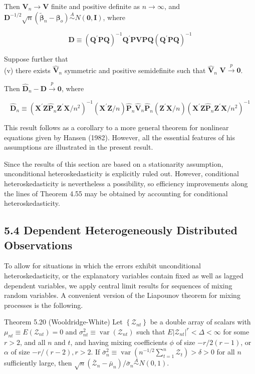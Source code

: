 \documentclass[10pt]{article}
\begin{document}
Then $\mathbf{V}_{n} \rightarrow \mathbf{V}$ finite and positive definite as $n \rightarrow \infty$, and $\mathbf{D}^{-1 / 2} \sqrt{n}\left(\tilde{\boldsymbol{\beta}}_{n}-\right. \left.\boldsymbol{\beta}_{o}\right) \stackrel{A}{\sim} N(\mathbf{0}, \mathbf{I})$, where

$$
\mathbf{D} \equiv\left(\mathbf{Q}^{\prime} \mathbf{P Q}\right)^{-1} \mathbf{Q}^{\prime} \mathbf{P V P Q}\left(\mathbf{Q}^{\prime} \mathbf{P Q}\right)^{-1}
$$

Suppose further that\\
(v) there exists $\hat{\mathbf{V}}_{n}$ symmetric and positive semidefinite such that $\hat{\mathbf{V}}_{n}$ $\mathbf{V} \xrightarrow{p} \mathbf{0}$.

Then $\hat{\mathbf{D}}_{n}-\mathbf{D} \xrightarrow{p} \mathbf{0}$, where

$$
\hat{\mathbf{D}}_{n} \equiv\left(\mathbf{X}^{\prime} \mathbf{Z} \hat{\mathbf{P}}_{n} \mathbf{Z}^{\prime} \mathbf{X} / n^{2}\right)^{-1}\left(\mathbf{X}^{\prime} \mathbf{Z} / n\right) \hat{\mathbf{P}}_{n} \hat{\mathbf{V}}_{n} \hat{\mathbf{P}}_{n}\left(\mathbf{Z}^{\prime} \mathbf{X} / n\right)\left(\mathbf{X}^{\prime} \mathbf{Z} \hat{\mathbf{P}}_{n} \mathbf{Z}^{\prime} \mathbf{X} / n^{2}\right)^{-1}
$$

This result follows as a corollary to a more general theorem for nonlinear equations given by Hansen (1982). However, all the essential features of his assumptions are illustrated in the present result.

Since the results of this section are based on a stationarity assumption, unconditional heteroskedasticity is explicitly ruled out. However, conditional heteroskedasticity is nevertheless a possibility, so efficiency improvements along the lines of Theorem 4.55 may be obtained by accounting for conditional heteroskedasticity.

\subsection*{5.4 Dependent Heterogeneously Distributed Observations}
To allow for situations in which the errors exhibit unconditional heteroskedasticity, or the explanatory variables contain fixed as well as lagged dependent variables, we apply central limit results for sequences of mixing random variables. A convenient version of the Liapounov theorem for mixing processes is the following.

Theorem 5.20 (Wooldridge-White) Let $\left\{\mathcal{Z}_{n t}\right\}$ be a double array of scalars with $\mu_{n t} \equiv E\left(\mathcal{Z}_{n t}\right)=0$ and $\sigma_{n t}^{2} \equiv \operatorname{var}\left(\mathcal{Z}_{n t}\right)$ such that $E\left|\mathcal{Z}_{n t}\right|^{r}< \Delta<\infty$ for some $r>2$, and all $n$ and $t$, and having mixing coefficients $\phi$ of size $-r / 2(r-1)$, or $\alpha$ of size $-r /(r-2), r>2$. If $\bar{\sigma}_{n}^{2} \equiv \operatorname{var}\left(n^{-1 / 2} \sum_{t=1}^{n} \mathcal{Z}_{t}\right)>\delta>0$ for all $n$ sufficiently large, then $\sqrt{n}\left(\overline{\mathcal{Z}}_{n}-\right. \left.\bar{\mu}_{n}\right) / \bar{\sigma}_{n} \stackrel{A}{\sim} N(0,1)$.
\end{document}
